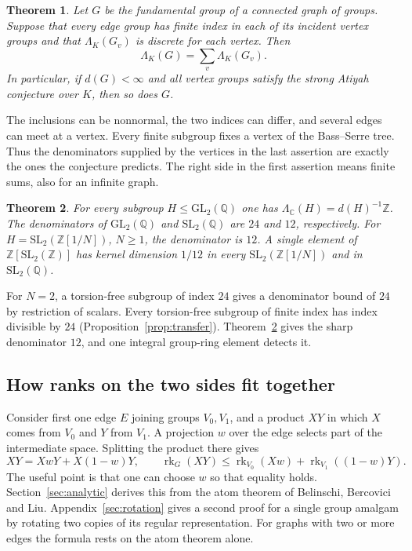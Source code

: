 \documentclass[11pt,a4paper,reqno]{amsart}
\numberwithin{equation}{section}
\newtheorem{mainthm}{Theorem}
\theoremstyle{remark}
\newcommand{\C}{\mathbb C}
\newcommand{\Q}{\mathbb Q}
\newcommand{\Z}{\mathbb Z}
\newcommand{\rk}{\operatorname{rk}}
\begin{document}
\begin{mainthm}\label{thm:main}
Let \(G\) be the fundamental group of a connected graph of groups. Suppose that every edge group has finite index in each of its incident vertex groups and that \(\Lambda_K(G_v)\) is discrete for each vertex. Then
\[
                 \Lambda_K(G)=\sum_v\Lambda_K(G_v).
\]
In particular, if \(d(G)<\infty\) and all vertex groups satisfy the strong Atiyah conjecture over \(K\), then so does \(G\).
\end{mainthm}

The inclusions can be nonnormal, the two indices can differ, and several edges can meet at a vertex. Every finite subgroup fixes a vertex of the Bass--Serre tree. Thus the denominators supplied by the vertices in the last assertion are exactly the ones the conjecture predicts. The right side in the first assertion means finite sums, also for an infinite graph.

\begin{mainthm}\label{thm:arith}
For every subgroup \(H\le\mathrm{GL}_2(\Q)\) one has \(\Lambda_{\C}(H)=d(H)^{-1}\Z\). The denominators of \(\mathrm{GL}_2(\Q)\) and \(\mathrm{SL}_2(\Q)\) are \(24\) and \(12\), respectively. For \(H=\mathrm{SL}_2(\Z[1/N])\), \(N\ge1\), the denominator is \(12\). A single element of \(\Z[\mathrm{SL}_2(\Z)]\) has kernel dimension \(1/12\) in every \(\mathrm{SL}_2(\Z[1/N])\) and in \(\mathrm{SL}_2(\Q)\).
\end{mainthm}

For \(N=2\), a torsion-free subgroup of index \(24\) gives a denominator bound of \(24\) by restriction of scalars. Every torsion-free subgroup of finite index has index divisible by \(24\) (Proposition~\ref{prop:transfer}). Theorem~\ref{thm:arith} gives the sharp denominator \(12\), and one integral group-ring element detects it.

\subsection*{How ranks on the two sides fit together}
Consider first one edge \(E\) joining groups \(V_0,V_1\), and a product \(XY\) in which \(X\) comes from \(V_0\) and \(Y\) from \(V_1\). A projection \(w\) over the edge selects part of the intermediate space. Splitting the product there gives
\[
 XY=XwY+X(1-w)Y,\qquad
 \rk_G(XY)\le \rk_{V_0}(Xw)+\rk_{V_1}((1-w)Y).
\]
The useful point is that one can choose \(w\) so that equality holds. Section~\ref{sec:analytic} derives this from the atom theorem of Belinschi, Bercovici and Liu. Appendix~\ref{sec:rotation} gives a second proof for a single group amalgam by rotating two copies of its regular representation. For graphs with two or more edges the formula rests on the atom theorem alone.
\end{document}
